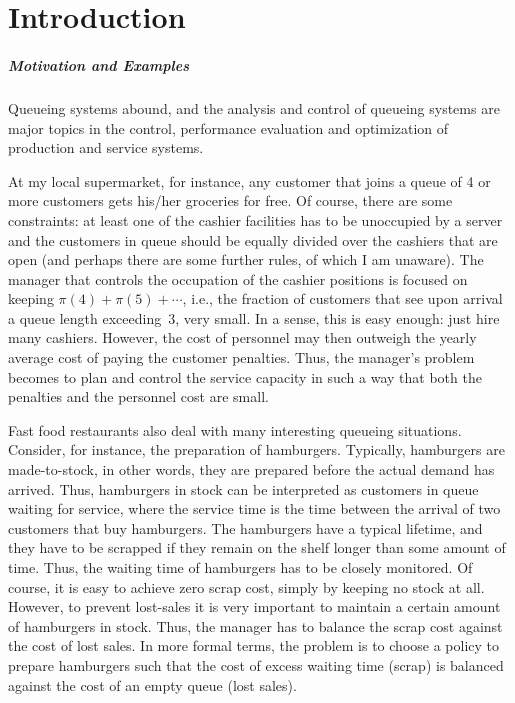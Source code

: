 \chapter*{Introduction}\label{sec:introduction}

\paragraph{Motivation and Examples}
Queueing systems abound, and the analysis and control of queueing systems are major topics in the control, performance evaluation and optimization of production and service systems.


At my local supermarket, for instance, any customer that joins a queue of 4 or more customers gets his/her groceries for free.
Of course, there are some constraints: at least one of the cashier facilities has to be unoccupied by a server and the customers in queue should be equally divided over the cashiers that are open (and perhaps there are some further rules, of which I am unaware).
The manager that controls the occupation of the cashier positions is focused on keeping $\pi(4)+\pi(5)+\cdots$, i.e., the fraction of customers that see upon arrival a queue length exceeding~3, very small.
In a sense, this is easy enough: just hire many cashiers.
However, the cost of personnel may then outweigh the yearly average cost of paying the customer penalties.
Thus, the manager's problem becomes to plan and control the service capacity in such a way that both the penalties and the personnel cost are small.

Fast food restaurants also deal with many interesting queueing situations.
Consider, for instance, the preparation of hamburgers.
Typically, hamburgers are made-to-stock, in other words, they are prepared before the actual demand has arrived.
Thus, hamburgers in stock can be interpreted as customers in queue waiting for service, where the service time is the time between the arrival of two customers that buy hamburgers.
The hamburgers have a typical lifetime, and they have to be scrapped if they remain on the shelf longer than some amount of time.
Thus, the waiting time of hamburgers has to be closely monitored.
Of course, it is easy to achieve zero scrap cost, simply by keeping no stock at all.
However, to prevent lost-sales it is very important to maintain a certain amount of hamburgers in stock.
Thus, the manager has to balance the scrap cost against the cost of lost sales.
In more formal terms, the problem is to choose a policy to prepare hamburgers such that the cost of excess waiting time (scrap) is balanced against the cost of an empty queue (lost sales).


